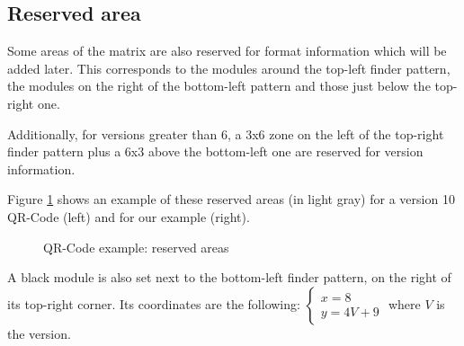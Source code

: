 \subsection{Reserved area}
\label{ssec:qr_reserved}

Some areas of the matrix are also reserved for format information which will be added later. This corresponds to the modules around the top-left finder pattern, the modules on the right of the bottom-left pattern and those just below the top-right one.

Additionally, for versions greater than 6, a 3x6 zone on the left of the top-right finder pattern plus a 6x3 above the bottom-left one are reserved for version information.

Figure \ref{fig:qr_reserved} shows an example of these reserved areas (in light gray) for a version 10 QR-Code (left) and for our example (right).

\begin{figure}[H]
  \centering
  \caption{QR-Code example: reserved areas}
  \label{fig:qr_reserved}
\end{figure}

A black module is also set next to the bottom-left finder pattern, on the right of its top-right corner. Its coordinates are the following:
\begin{math}
  \begin{cases}
    x = 8 \\
    y = 4V + 9
  \end{cases}
\end{math}
where $V$ is the version.

